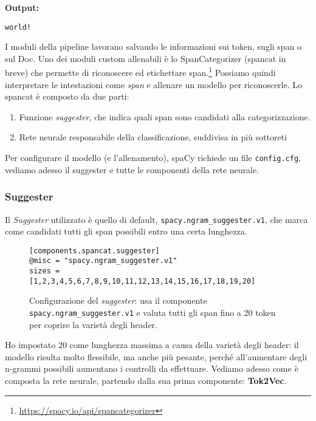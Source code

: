 \noindent \textbf{Output:}

\begin{lstlisting}[style=output]
world!
\end{lstlisting}

\noindent I moduli della pipeline lavorano salvando le informazioni sui token, sugli span o sul Doc. Uno dei moduli custom allenabili è lo SpanCategorizer (spancat in breve) che permette di riconoscere ed etichettare span.\footnote{\url{https://spacy.io/api/spancategorizer}} Possiamo quindi interpretare le intestazioni come \textit{span} e allenare un modello per riconoscerle. Lo spancat è composto da due parti:
\begin{enumerate}
    \item Funzione \textit{suggester}, che indica quali span sono candidati alla categorizzazione.
    \item Rete neurale responsabile della classificazione, suddivisa in più sottoreti
\end{enumerate}

\noindent Per configurare il modello (e l'allenamento), spaCy richiede un file \texttt{config.cfg}, vediamo adesso il suggester e tutte le componenti della rete neurale.
\subsubsection{Suggester}
Il \textit{Suggester} utilizzato è quello di default, \texttt{spacy.ngram\_suggester.v1}, che marca come candidati tutti gli span possibili entro una certa lunghezza.

\begin{figure}[H]
    \centering
    \scriptsize
\begin{lstlisting}[style=cmd]
[components.spancat.suggester]
@misc = "spacy.ngram_suggester.v1"
sizes = [1,2,3,4,5,6,7,8,9,10,11,12,13,14,15,16,17,18,19,20]
\end{lstlisting}
    \caption{Configurazione del \textit{suggester}: usa il componente \texttt{spacy.ngram\_suggester.v1} e valuta tutti gli span fino a 20 token per coprire la varietà degli header.}
    \label{fig:cfg-suggester}
\end{figure}

\noindent Ho impostato 20 come lunghezza massima a causa della varietà degli header: il modello risulta molto flessibile, ma anche più pesante, perché all'aumentare degli n-grammi possibili aumentano i controlli da effettuare.
Vediamo adesso come è composta la rete neurale, partendo dalla sua prima componente: \textbf{Tok2Vec}.
